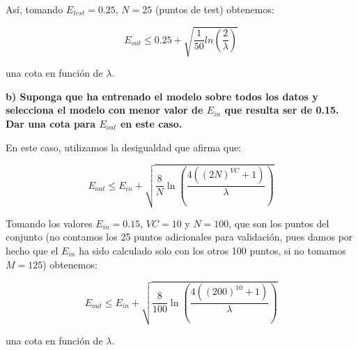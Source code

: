 \documentclass{article}
\begin{document}
	Así, tomando $E_{test} = 0.25$, $N = 25$ (puntos de test) obtenemos:
	
	\[
		E_{out} \leq 0.25 + \sqrt{\frac{1}{50}ln\left( \frac{2}{\lambda}\right)}
	\]

	una cota en función de $\lambda$.
	
	\textbf{b) Suponga que ha entrenado el modelo sobre todos los datos y selecciona el modelo con
menor valor de $E_{in}$ que resulta ser de 0.15. Dar una cota para $E_{out}$ en este caso.}

	En este caso, utilizamos la desigualdad que afirma que:
	
	\[
		E_{out} \leq E_{in} + \sqrt{\frac{8}{N}\ln\left( \frac{4((2N)^{VC} + 1)}{\lambda}\right)}
	\]
	
	Tomando los valores $E_{in} = 0.15$, $VC = 10$ y $N = 100$, que son los puntos del conjunto (no contamos los 25 puntos adicionales para validación, pues damos por hecho que el $E_{in}$ ha sido calculado solo con los otros 100 puntos, si no tomamos $M=125$) obtenemos:
	
	\[
		E_{out} \leq E_{in} + \sqrt{\frac{8}{100}\ln\left( \frac{4((200)^10+ 1)}{\lambda}\right)}
	\]
	
	una cota en función de $\lambda$.
	
\end{document}
